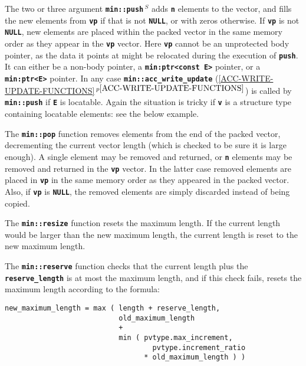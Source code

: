\documentclass[12pt]{article}
\newcommand{\TT}[1]{{\tt \bfseries #1}}
\newcommand{\itemref}[1]{\ref{#1}$\,^{p\pageref{#1}}$}
\newcommand{\EOL}{\penalty \exhyphenpenalty}
\newenvironment{indpar}[1][0.3in]%
	{\begin{list}{}%
		     {\setlength{\itemsep}{0in}%
		      \setlength{\topsep}{0in}%
		      \setlength{\parsep}{1ex}%
		      \setlength{\labelwidth}{#1}%
		      \setlength{\leftmargin}{#1}%
		      \addtolength{\leftmargin}{\labelsep}}%
	 \item}%
	{\end{list}}
\newcommand{\RESIZE}{$\,^S$}
\begin{document}
The two or three argument \TT{min::\EOL push\RESIZE} adds \TT{n}
elements to the vector, and fills the new elements from \TT{vp}
if that is not \TT{NULL}, or with zeros otherwise.
If \TT{vp} is not \TT{NULL},
new elements are placed within the packed vector in the same
memory order as they appear in the \TT{vp} vector.
Here \TT{vp} cannot be an unprotected body pointer, as the data
it points at might be relocated during the execution of \TT{push}.
It can either be a non-body pointer, a \TT{min:\EOL ptr<const E>} pointer,
or a \TT{min:\EOL ptr<E>} pointer.
In any case \TT{min::\EOL acc\_\EOL write\_\EOL update} 
(\itemref{ACC-WRITE-UPDATE-FUNCTIONS})
is called by \TT{min::\EOL push} if \TT{E} is locatable.
Again the situation is tricky if \TT{v} is
a structure type containing locatable elements: see the below example.

The \TT{min::pop} function removes elements from the end of the
packed vector, decrementing the current vector length (which is checked
to be sure it is large enough).   A single element may be removed and
returned, or \TT{n} elements may be removed and returned in the
\TT{vp} vector.  In the latter case removed elements are placed in
\TT{vp} in the same memory order as they appeared in the packed vector.
Also,
if \TT{vp} is \TT{NULL}, the removed elements are simply discarded
instead of being copied.

The \TT{min::resize} function resets the maximum length.  If
the current length would be larger than the new maximum length,
the current length is reset to the new maximum length.

The \TT{min::reserve} function checks that
the current length plus the \TT{reserve\_length} is
at most the maximum length, and if this check fails,
resets the maximum length according to the formula:
\begin{indpar}\begin{verbatim}
new_maximum_length = max ( length + reserve_length,
                           old_maximum_length
                           +
                           min ( pvtype.max_increment,
                                   pvtype.increment_ratio
                                 * old_maximum_length ) )
\end{verbatim}\end{indpar}\label{PACKED-VEC-EXPANSION-FORMULA}
\end{document}
